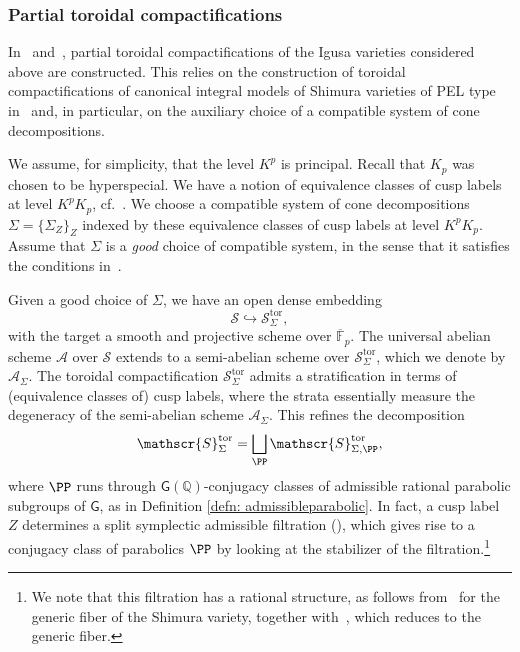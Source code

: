 \documentclass[letterpaper,11pt]{amsart}
\begin{document}
\subsubsection{Partial toroidal compactifications}

In~\cite[\S 3.2]{CS2} and~\cite[\S 3.2]{santos}, partial toroidal compactifications of the Igusa varieties considered above are constructed. This relies on the construction of toroidal compactifications of canonical integral models of Shimura varieties of PEL type in~\cite{lan-thesis} and, in particular, on the auxiliary choice of a compatible system of cone decompositions. 

We assume, for simplicity, that the level $K^p$ is principal. Recall that $K_p$ was chosen to be hyperspecial. We have a notion of equivalence classes of cusp labels at level $K^pK_p$, cf.~\cite[\S 5.4]{lan-thesis}. We choose a compatible system of cone decompositions $\Sigma = \{\Sigma_Z\}_{Z}$ indexed by these equivalence classes of cusp labels at level $K^pK_p$. Assume that $\Sigma$ is a \emph{good} choice of compatible system, in the sense that it satisfies the conditions in~\cite[Remark 2.5.6]{CS2}. 

Given a good choice of $\Sigma$, we have an open dense embedding
\[
\mathscr{S}\hookrightarrow \mathscr{S}_{\Sigma}^{\mathrm{tor}},
\]
with the target a smooth and projective scheme over $\overline{\mathbb{F}}_p$. The universal abelian scheme $\mathcal{A}$ over $\mathscr{S}$ extends to a semi-abelian scheme over $\mathscr{S}_{\Sigma}^{\mathrm{tor}}$, which we denote by $\mathcal{A}_{\Sigma}$. The toroidal compactification $\mathscr{S}_{\Sigma}^{\mathrm{tor}}$ admits a stratification in terms of (equivalence classes of) cusp labels, where the strata essentially measure the degeneracy of the semi-abelian scheme $\mathcal{A}_{\Sigma}$. This refines the decomposition 
\begin{equation}{\label{eqn: decompositionoftoroidalintoparabolics}}
\mathscr{S}^{\mathrm{tor}}_{\Sigma} = \bigsqcup_{\PP} \mathscr{S}^{\mathrm{tor}}_{\Sigma, \PP},
\end{equation}
where $\PP$ runs through $\mathsf{G}(\mathbb{Q})$-conjugacy classes of admissible rational parabolic subgroups of $\mathsf{G}$, as in Definition \ref{defn: admissibleparabolic}. In fact, a cusp label $Z$ determines a split symplectic admissible filtration (\cite[Section~5.2.1]{lan-thesis}), which gives rise to a conjugacy class of parabolics $\PP$ by looking at the stabilizer of the filtration.\footnote{We note that this filtration has a rational structure, as follows from~\cite[Prop. A.5.9]{Lan-ANT} for the generic fiber of the Shimura variety, together with~\cite[Lemma A.4.7]{Lan-ANT}, which reduces to the generic fiber.}
\end{document}
